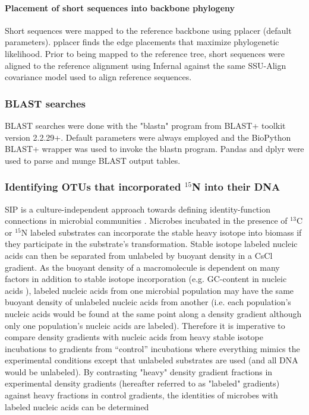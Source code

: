 \paragraph{Placement of short sequences into backbone phylogeny}
Short sequences were mapped to the reference backbone using pplacer
\citep{Matsen_2010} (default parameters). pplacer finds the edge placements
that maximize phylogenetic likelihood. Prior to being mapped to the reference
tree, short sequences were aligned to the reference alignment using Infernal
\citep{19307242} against the same SSU-Align covariance model used to align
reference sequences.

\subsubsection{BLAST searches}
BLAST searches were done with the "blastn" program from BLAST+ toolkit
\citep{20003500} version 2.2.29+. Default parameters were always employed and
the BioPython \citep{19304878} BLAST+ wrapper was used to invoke the blastn
program. Pandas \citep{citeulike:11241428} and dplyr \citep{dplyr} were used to
parse and munge BLAST output tables.  

\subsubsection{Identifying OTUs that incorporated $^{15}$N into their DNA}
SIP is a culture-independent approach towards defining identity-function
connections in microbial communities \citep{Buckley_2011, 17446886}. Microbes
incubated in the presence of $^{13}$C or $^{15}$N labeled substrates can
incorporate the stable heavy isotope into biomass if they participate in the
substrate's transformation.  Stable isotope labeled nucleic acids can then be
separated from unlabeled by buoyant density in a CsCl gradient. As the
buoyant density of a macromolecule is dependent on many factors in addition
to stable isotope incorporation (e.g.  GC-content in nucleic acids
\citep{25139123}), labeled nucleic acids from one microbial population may
have the same buoyant density of unlabeled nucleic acids from another (i.e.
each population's nucleic acids would be found at the same point along a
density gradient although only one population's nucleic acids are labeled).
Therefore it is imperative to compare density gradients with nucleic acids
from heavy stable isotope incubations to gradients from ``control''
incubations where everything mimics the experimental conditions except that
unlabeled substrates are used (and all DNA would be unlabeled).  By
contrasting "heavy" density gradient fractions in experimental density
gradients (hereafter referred to as "labeled" gradients) against heavy
fractions in control gradients, the identities of microbes with labeled
nucleic acids can be determined 

